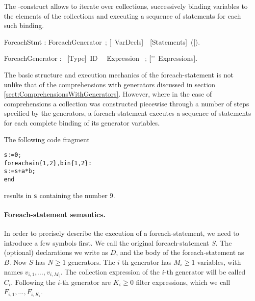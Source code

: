 


The \kwForeach-construct allows
to iterate over collections, successively binding variables to the
elements of the collections and executing a sequence of statements for
each such binding.


\bgr
ForeachStmt : ForeachGenerator~;
 [\kwVar~VarDecls]~\kwDo~[Statements]~(\kwEnd|\kwEndForeach).

ForeachGenerator : \kwForeach~[Type]~ID ~\kwIn~Expression~ ;
  ['\charComma'~Expressions].
\egr


The basic structure and
execution mechanics of the foreach-statement is not unlike that of the
comprehensions with generators discussed in section
\ref{sect:ComprehensionsWithGenerators}. However, where in the case of
comprehensions a collection was constructed piecewise through a number
of steps specified by the generators, a foreach-statement executes a
sequence of statements for each complete binding of its generator
variables.

\begin{example}
  The following code fragment
\begin{alltt}   s := 0;
   foreach a in \{1, 2\}, b in \{1, 2\}:
     s := s + a*b;
   end
\end{alltt}
results in {\tt s} containing the number 9.
\end{example}

\paragraph{Foreach-statement semantics.}
In order to
precisely describe the execution of a foreach-statement, we need to introduce a few symbols first. We
call the original foreach-statement $S$. The (optional) declarations
we write as $D$, and the body of the foreach-statement as $B$. Now $S$ has $N \geq
1$ generators. The $i$-th generator has $M_i \geq 1$ variables, with
names $v_{i,1}, ..., v_{i, {M_i}}$. The collection expression of the
$i$-th generator will be called $C_i$.  Following the $i$-th generator
are $K_i \geq 0$ filter expressions, which we call $F_{i, 1}, ...,
F_{i, {K_i}}$. 


